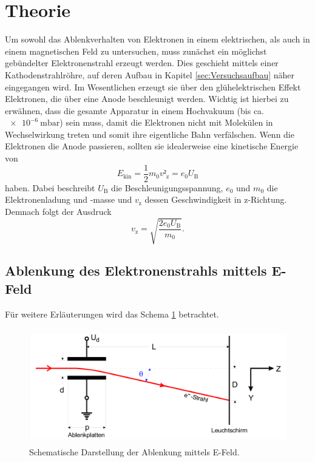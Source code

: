 \section{Theorie}
\label{sec:Theorie}

Um sowohl das Ablenkverhalten von Elektronen in einem elektrischen, als auch in einem magnetischen Feld zu untersuchen, muss zunächst ein möglichst gebündelter Elektronenstrahl erzeugt werden.
Dies geschieht mittels einer Kathodenstrahlröhre, auf deren Aufbau in Kapitel \ref{sec:Versuchsaufbau} näher eingegangen wird.
Im Wesentlichen erzeugt sie über den glühelektrischen Effekt Elektronen, die über eine Anode beschleunigt werden.
Wichtig ist hierbei zu erwähnen, dass die gesamte Apparatur in einem Hochvakuum (bis ca. $\SI{e-6}{\milli\bar}$) sein muss, damit die Elektronen nicht mit Molekülen in Wechselwirkung treten und somit ihre eigentliche Bahn verfälschen.
Wenn die Elektronen die Anode passieren, sollten sie idealerweise eine kinetische Energie von
\begin{equation}
  E_{\text{kin}} = \frac{1}{2}m_0 v²_{\text{z}} = e_0 U_{\text{B}}
\end{equation}
haben.
Dabei beschreibt $U_{\text{B}}$ die Beschleunigungsspannung, $e_0$ und $m_0$ die Elektronenladung und -masse und $v_{\text{z}}$ dessen Geschwindigkeit in z-Richtung.
Demnach folgt der Ausdruck
\begin{equation}
  v_{\text{z}} = \sqrt{\frac{2 e_0 U_{\text{B}}}{m_0}}. \label{eqn:1}
\end{equation}

\subsection{Ablenkung des Elektronenstrahls mittels E-Feld}
Für weitere Erläuterungen wird das Schema \ref{fig:1} betrachtet.

\begin{figure}
  \centering
  \includegraphics[height=5cm]{ressources/schema.png}
  \caption{Schematische Darstellung der Ablenkung mittels E-Feld. \cite{skript1}}
  \label{fig:1}
\end{figure}

